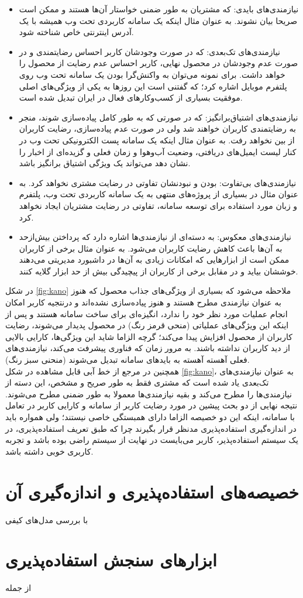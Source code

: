 \begin{itemize}
	\item 
	نیازمندی‌های بایدی: که مشتریان به طور ضمنی خواستار آن‌ها هستند و ممکن است صریحا بیان نشوند. به عنوان مثال اینکه یک سامانه کاربردی تحت وب همیشه با یک آدرس اینترنتی خاص
	شناخته شود.
	\item
	نیازمندی‌های تک‌بعدی: که در صورت وجودشان کاربر احساس رضایتمندی و در صورت عدم وجودشان در محصول نهایی، کاربر احساس عدم رضایت از محصول را خواهد داشت. برای نمونه می‌توان به واکنش‌گرا بودن یک سامانه تحت وب روی پلتفرم موبایل اشاره کرد؛ که گفتنی است این روزها به یکی از ویژگی‌های اصلی موفقیت بسیاری از کسب‌وکارهای فعال در ایران تبدیل شده است.
	\item 
	نیازمندی‌های اشتیاق‌برانگیز: که در صورتی که به طور کامل پیاده‌سازی شوند، منجر به رضایتمندی کاربران خواهند شد ولی در صورت عدم پیاده‌سازی، رضایت کاربران از بین نخواهد رفت. به عنوان مثال اینکه یک سامانه پست الکترونیکی تحت وب در کنار لیست ایمیل‌های دریافتی، وضعیت آب‌وهوا و زمان فعلی و گزیده‌ای از اخبار را نشان دهد می‌تواند یک ویژگی اشتیاق برانگیز باشد.
	\item 
	نیازمندی‌های بی‌تفاوت: بودن و نبودنشان تفاوتی در رضایت مشتری نخواهد کرد. به عنوان مثال در بسیاری از پروژه‌های منتهی به یک سامانه کاربردی تحت وب، پلتفرم و زبان مورد استفاده برای توسعه سامانه، تفاوتی در رضایت مشتریان ایجاد نخواهد کرد.
	\item 
	نیازمندی‌های معکوس: به دسته‌ای از نیازمندی‌ها اشاره دارد که پرداختن بیش‌ازحد به آن‌ها باعث کاهش رضایت کاربران می‌شود. به عنوان مثال برخی از کاربران ممکن است از ابزارهایی که امکانات زیادی به آن‌ها در داشبورد مدیریتی می‌دهند خوششان بیاید و در مقابل برخی از کاربران از پیچیدگی بیش از حد ابزار گلایه کنند.
\end{itemize}
در شکل
\ref{fig:kano}
ملاحظه می‌شود که بسیاری از ویژگی‌های جذاب محصول که هنوز به عنوان نیازمندی مطرح هستند و هنوز پیاده‌سازی نشده‌اند و درنتجیه کاربر امکان انجام عملیات مورد نظر خود را ندارد، انگیزه‌ای برای ساخت سامانه هستند و پس از اینکه این ویژگی‌های عملیاتی (منحی قرمز رنگ) در محصول پدیدار می‌شوند، رضایت کاربران از محصول افزایش پیدا می‌کند؛ گرچه الزاما شاید این ویژگی‌ها، کارایی بالایی از دید کاربران نداشته باشند. به مرور زمان که فناوری پیشرفت می‌کند، نیازمندی‌های فعلی آهسته آهسته به باید‌های سامانه تبدیل می‌شوند (منحنی سبز رنگ).\\
همچنین در مرجع
\cite{sauerwein_kano_1996}
از خط آبی قابل مشاهده در شکل
\ref{fig:kano}،
به عنوان نیازمندی‌های تک‌بعدی یاد شده است که مشتری فقط به طور صریح و مشخص، این دسته از نیازمندی‌ها را مطرح می‌کند و بقیه نیازمندی‌ها معمولا به طور ضمنی مطرح می‌شوند.
نتیجه نهایی از دو بحث پیشین در مورد رضایت کاربر از سامانه و کارایی کاربر در تعامل با سامانه، اینکه این دو خصیصه الزاما دارای همبستگی خاصی نیستند؛ ولی همواره باید در اندازه‌گیری استفاده‌پذیری مدنظر قرار بگیرند چرا که طبق تعریف استفاده‌پذیری، در یک سیستم استفاده‌پذیر، کاربر می‌بایست در نهایت از سیستم راضی بوده باشد و تجربه کاربری خوبی داشته باشد.
\section{خصیصه‌های استفاده‌پذیری و اندازه‌گیری آن}
با بررسی مدل‌های کیفی 
\section{ابزارهای سنجش استفاده‌پذیری}
از جمله 





